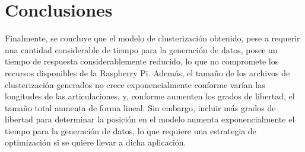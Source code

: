 \section{Conclusiones}

Finalmente, se concluye que el modelo de clusterización obtenido, pese a requerir una cantidad considerable de tiempo para la generación de datos, posee un tiempo de respuesta considerablemente reducido, lo que no compromete los recursos disponibles de la Raspberry Pi. Además, el tamaño de los archivos de clusterización generados no crece exponencialmente conforme varían las longitudes de las articulaciones, y, conforme aumenten los grados de libertad, el tamaño total aumenta de forma lineal. Sin embargo, incluir más grados de libertad para determinar la posición en el modelo aumenta exponencialmente el tiempo para la generación de datos, lo que requiere una estrategia de optimización si se quiere llevar a dicha aplicación.